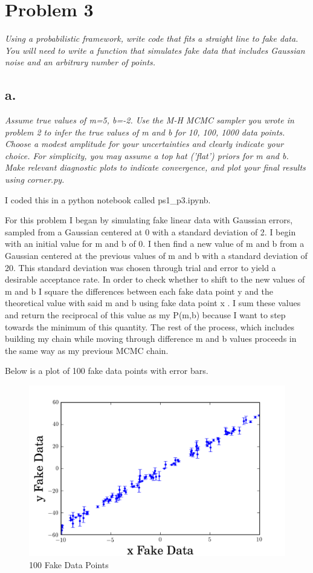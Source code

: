 \documentclass[english,12pt]{article}
\begin{document}
\section*{Problem 3}

\textit{Using a probabilistic framework, write code that fits a straight line to fake data. You will need to write a function that simulates fake data that includes Gaussian noise and an arbitrary number of points.}

\subsection*{a.}
\textit{Assume true values of m=5, b=-2. Use the M-H MCMC sampler you wrote in problem 2 to infer the true values of m and b for 10, 100, 1000 data points. Choose a modest amplitude for your uncertainties and clearly indicate your choice. For simplicity, you may assume a top hat ('flat') priors for m and b. Make relevant diagnostic plots to indicate convergence, and plot your final results using corner.py.}

I coded this in a python notebook called ps1\_p3.ipynb.

For this problem I began by simulating fake linear data with Gaussian errors, sampled from a Gaussian centered at 0 with a standard deviation of 2. 
I begin with an initial value for m and b of 0. I then find a new value of m and b from a Gaussian centered at the previous values of m and b with a standard deviation of 20. This standard deviation was chosen through trial and error to yield a desirable acceptance rate. In order to check whether to shift to the new values of m and b I square the differences between each fake data point y and the theoretical value with said m and b using fake data point x . I sum these values and return the reciprocal of this value as my P(m,b) because I want to step towards the minimum of this quantity. The rest of the process, which includes building my chain while moving through difference m and b values proceeds in the same way as my previous MCMC chain.

Below is a plot of 100 fake data points with error bars.

\begin{figure}[H]
\centering
\caption{100 Fake Data Points}
\includegraphics[scale = 0.6]{x_y_100_fake_data_points.png}
\end{figure}
\end{document}
